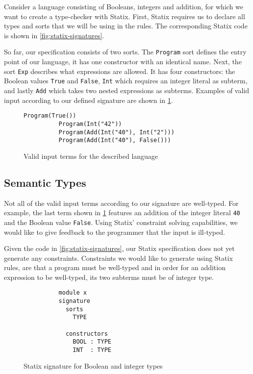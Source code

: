       \noindent
      Consider a language consisting of Booleans, integers and addition, for which we want to create a type-checker with Statix. First, Statix requires us to declare all types and sorts that we will be using in the rules. The corresponding Statix code is shown in \cref{fig:statix-signatures}.

      So far, our specification consists of two sorts. The \texttt{Program} sort defines the entry point of our language, it has one constructor with an identical name. Next, the sort \texttt{Exp} describes what expressions are allowed. It has four constructors: the Boolean values \texttt{True} and \texttt{False}, \texttt{Int} which requires an integer literal as subterm, and lastly \texttt{Add} which takes two nested expressions as subterms. Examples of valid input according to our defined signature are shown in \cref{fig:statix-valid-input}.

      \begin{figure}[H]
        \begin{lstlisting}[frame=single]
          Program(True())
          Program(Int("42"))
          Program(Add(Int("40"), Int("2")))
          Program(Add(Int("40"), False()))
        \end{lstlisting}
        \caption{\label{fig:statix-valid-input}Valid input terms for the described language}
      \end{figure}

    \subsection{Semantic Types}

      Not all of the valid input terms according to our signature are well-typed. For example, the last term shown in \cref{fig:statix-valid-input} features an addition of the integer literal \texttt{40} and the Boolean value \texttt{False}. Using Statix' constraint solving capabilities, we would like to give feedback to the programmer that the input is ill-typed.

      Given the code in \cref{fig:statix-signatures}, our Statix specification does not yet generate any constraints. Constraints we would like to generate using Statix rules, are that a program must be well-typed and in order for an addition expression to be well-typed, its two subterms must be of integer type.

      \begin{wrapfigure}{r}{0.5\linewidth}
        \vspace{-20pt}
        \capstart
        \begin{verbatim}
          module x
          signature
            sorts
              TYPE
            
            constructors
              BOOL : TYPE
              INT  : TYPE
        \end{verbatim}
        \caption{\label{fig:statix-type-signatures}Statix signature for Boolean and integer types}
        \vspace{-40pt}
      \end{wrapfigure}

